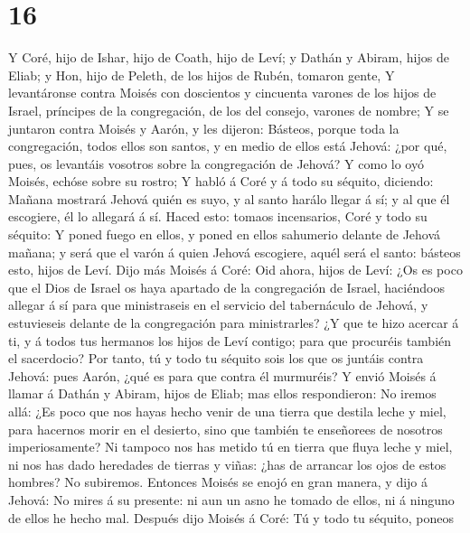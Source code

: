 \hypertarget{section-15}{%
\section{16}\label{section-15}}

 Y Coré, hijo de Ishar, hijo de Coath, hijo de Leví; y
Dathán y Abiram, hijos de Eliab; y Hon, hijo de Peleth, de los hijos de
Rubén, tomaron gente,  Y levantáronse contra Moisés con
doscientos y cincuenta varones de los hijos de Israel, príncipes de la
congregación, de los del consejo, varones de nombre;  Y se
juntaron contra Moisés y Aarón, y les dijeron: Básteos, porque toda la
congregación, todos ellos son santos, y en medio de ellos está Jehová:
¿por qué, pues, os levantáis vosotros sobre la congregación de Jehová?
 Y como lo oyó Moisés, echóse sobre su rostro;
 Y habló á Coré y á todo su séquito, diciendo: Mañana
mostrará Jehová quién es suyo, y al santo harálo llegar á sí; y al que
él escogiere, él lo allegará á sí.  Haced esto: tomaos
incensarios, Coré y todo su séquito:  Y poned fuego en
ellos, y poned en ellos sahumerio delante de Jehová mañana; y será que
el varón á quien Jehová escogiere, aquél será el santo: básteos esto,
hijos de Leví.  Dijo más Moisés á Coré: Oid ahora, hijos
de Leví:  ¿Os es poco que el Dios de Israel os haya
apartado de la congregación de Israel, haciéndoos allegar á sí para que
ministraseis en el servicio del tabernáculo de Jehová, y estuvieseis
delante de la congregación para ministrarles?  ¿Y que te
hizo acercar á ti, y á todos tus hermanos los hijos de Leví contigo;
para que procuréis también el sacerdocio?  Por tanto, tú
y todo tu séquito sois los que os juntáis contra Jehová: pues Aarón,
¿qué es para que contra él murmuréis?  Y envió Moisés á
llamar á Dathán y Abiram, hijos de Eliab; mas ellos respondieron: No
iremos allá:  ¿Es poco que nos hayas hecho venir de una
tierra que destila leche y miel, para hacernos morir en el desierto,
sino que también te enseñorees de nosotros imperiosamente?
 Ni tampoco nos has metido tú en tierra que fluya leche y
miel, ni nos has dado heredades de tierras y viñas: ¿has de arrancar los
ojos de estos hombres? No subiremos.  Entonces Moisés se
enojó en gran manera, y dijo á Jehová: No mires á su presente: ni aun un
asno he tomado de ellos, ni á ninguno de ellos he hecho mal.
 Después dijo Moisés á Coré: Tú y todo tu séquito, poneos
